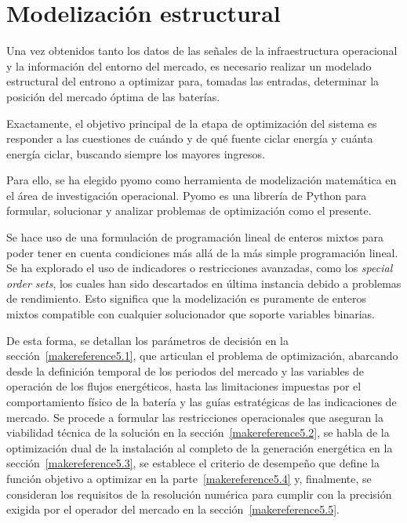 \cleardoublepage

\chapter{Modelización estructural}
\label{makereference5}

Una vez obtenidos tanto los datos de las señales de la infraestructura operacional y la información del entorno del mercado, es necesario realizar un modelado estructural del entrono a optimizar para, tomadas las entradas, determinar la posición del mercado óptima de las baterías.

Exactamente, el objetivo principal de la etapa de optimización del sistema es responder a las cuestiones de cuándo y de qué fuente ciclar energía y cuánta energía ciclar, buscando siempre los mayores ingresos.

Para ello, se ha elegido pyomo como herramienta de modelización matemática en el área de investigación operacional. Pyomo es una librería de Python para formular, solucionar y analizar problemas de optimización como el presente.

Se hace uso de una formulación de programación lineal de enteros mixtos para poder tener en cuenta condiciones más allá de la más simple programación lineal. Se ha explorado el uso de indicadores o restricciones avanzadas, como los \textit{special order sets}, los cuales han sido descartados en última instancia debido a problemas de rendimiento. Esto significa que la modelización es puramente de enteros mixtos compatible con cualquier solucionador que soporte variables binarias.

De esta forma, se detallan los parámetros de decisión en la sección~\ref{makereference5.1}, que articulan el problema de optimización, abarcando desde la definición temporal de los periodos del mercado y las variables de operación de los flujos energéticos, hasta las limitaciones impuestas por el comportamiento físico de la batería y las guías estratégicas de las indicaciones de mercado. Se procede a formular las restricciones operacionales que aseguran la viabilidad técnica de la solución en la sección~\ref{makereference5.2}, se habla de la optimización dual de la instalación al completo de la generación energética en la sección~\ref{makereference5.3}, se establece el criterio de desempeño que define la función objetivo a optimizar en la parte~\ref{makereference5.4} y, finalmente, se consideran los requisitos de la resolución numérica para cumplir con la precisión exigida por el operador del mercado en la sección~\ref{makereference5.5}.

